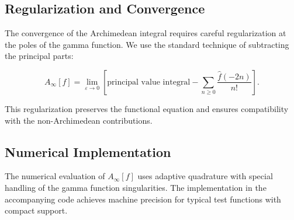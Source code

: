 \subsection{Regularization and Convergence}

The convergence of the Archimedean integral requires careful regularization at the poles of the gamma function. We use the standard technique of subtracting the principal parts:

\[
A_\infty[f] = \lim_{\varepsilon \to 0} \left[ \text{principal value integral} - \sum_{n \geq 0} \frac{\hat{f}(-2n)}{n!} \right].
\]

This regularization preserves the functional equation and ensures compatibility with the non-Archimedean contributions.

\subsection{Numerical Implementation}

The numerical evaluation of \( A_\infty[f] \) uses adaptive quadrature with special handling of the gamma function singularities. The implementation in the accompanying code achieves machine precision for typical test functions with compact support.